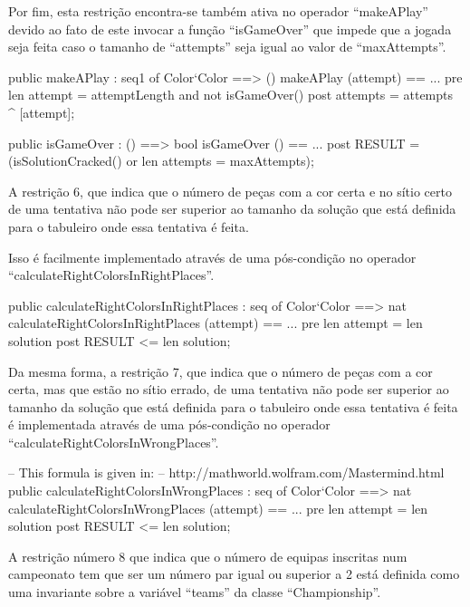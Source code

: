 Por fim, esta restrição encontra-se também ativa no operador
``makeAPlay'' devido ao fato de este invocar a função ``isGameOver''
que impede que a jogada seja feita caso o tamanho de ``attempts'' seja
igual ao valor de ``maxAttempts''.

\begin{vdm_al}
  public makeAPlay : seq1 of Color`Color ==> ()
    makeAPlay (attempt) == ...
  pre len attempt = attemptLength and
    not isGameOver()
  post attempts = attempts~ ^ [attempt];
\end{vdm_al}

\begin{vdm_al}
  public isGameOver : () ==> bool
    isGameOver () == ...
  post RESULT = (isSolutionCracked() or len attempts = maxAttempts);
\end{vdm_al}

A restrição 6, que indica que o número de peças com a cor certa e no
sítio certo de uma tentativa não pode ser superior ao tamanho da
solução que está definida para o tabuleiro onde essa tentativa é
feita.

Isso é facilmente implementado através de uma pós-condição no operador
``calculateRightColorsInRightPlaces''.

\begin{vdm_al}
  public calculateRightColorsInRightPlaces : seq of Color`Color ==> nat
    calculateRightColorsInRightPlaces (attempt) == ...
  pre len attempt = len solution
  post RESULT <= len solution;
\end{vdm_al}

Da mesma forma, a restrição 7, que indica que o número de peças com a
cor certa, mas que estão no sítio errado, de uma tentativa não pode
ser superior ao tamanho da solução que está definida para o tabuleiro
onde essa tentativa é feita é implementada através de uma pós-condição
no operador ``calculateRightColorsInWrongPlaces''.

\begin{vdm_al}
  -- This formula is given in:
  -- http://mathworld.wolfram.com/Mastermind.html
  public calculateRightColorsInWrongPlaces : seq of Color`Color ==> nat
    calculateRightColorsInWrongPlaces (attempt) == ...
  pre len attempt = len solution
  post RESULT <= len solution;
\end{vdm_al}

A restrição número 8 que indica que o número de equipas inscritas num
campeonato tem que ser um número par igual ou superior a 2 está
definida como uma invariante sobre a variável ``teams'' da classe
``Championship''.

